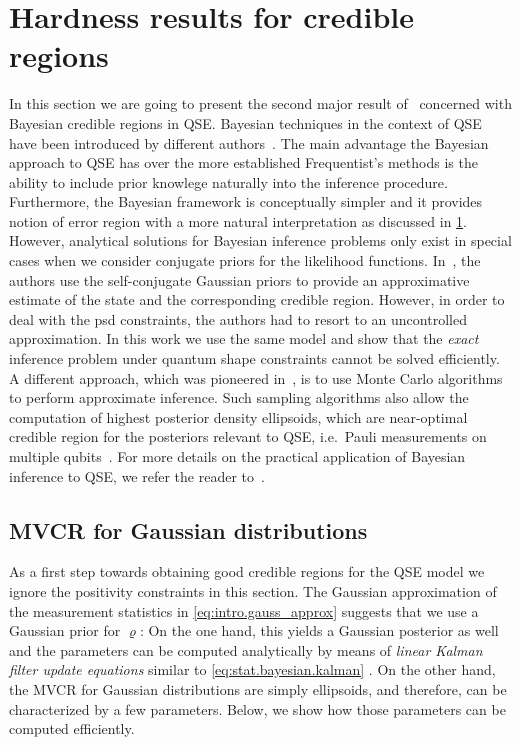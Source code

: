 \section{Hardness results for credible regions}
\label{sec:error.bayesian}

In this section we are going to present the second major result of~\cite{Suess_2016_Error} concerned with Bayesian credible regions in QSE.
Bayesian techniques in the context of QSE have been introduced by different authors~\cite{Jones_1991_Principles,Slater_1995_Quantum,Derka_1997_From,Schack_2001_Quantum,Buzek_1998_Reconstruction}.
The main advantage the Bayesian approach to QSE has over the more established Frequentist's methods is the ability to include prior knowlege naturally into the inference procedure.
Furthermore, the Bayesian framework is conceptually simpler and it provides notion of error region with a more natural interpretation as discussed in \cref{sec:error.bayesian}.
However, analytical solutions for Bayesian inference problems only exist in special cases when we consider conjugate priors for the likelihood functions.
In~\cite{Audenaert_2009_Quantum}, the authors use the self-conjugate Gaussian priors to provide an approximative estimate of the state and the corresponding credible region.
However, in order to deal with the psd constraints, the authors had to resort to an uncontrolled approximation.
In this work we use the same model and show that the \emph{exact} inference problem under quantum shape constraints cannot be solved efficiently.
A different approach, which was pioneered in~\cite{Huszar_2012_Adaptive,Ferrie_2014_Quantum}, is to use Monte Carlo algorithms to perform approximate inference.
Such sampling algorithms also allow the computation of highest posterior density ellipsoids, which are near-optimal credible region for the posteriors relevant to QSE, i.e.\ Pauli measurements on multiple qubits~\cite{Ferrie_2014_High}.
For more details on the practical application of Bayesian inference to QSE, we refer the reader to~\cite{Granade_2016_Practicala}.


\subsection{MVCR for Gaussian distributions}
\label{sub:bayesian.gaussian}

As a first step towards obtaining good credible regions for the QSE model we ignore the positivity constraints in this section.
The Gaussian approximation of the measurement statistics in \cref{eq:intro.gauss_approx} suggests that we use a Gaussian prior for $\varrho$:
On the one hand, this yields a Gaussian posterior as well and the parameters can be computed analytically by means of \emph{linear Kalman filter update equations} similar to \cref{eq:stat.bayesian.kalman} \cite[Sec.\ 2.4]{Audenaert_2009_Quantum}.
On the other hand, the MVCR for Gaussian distributions are simply ellipsoids, and therefore, can be characterized by a few parameters.
Below, we show how those parameters can be computed efficiently.

